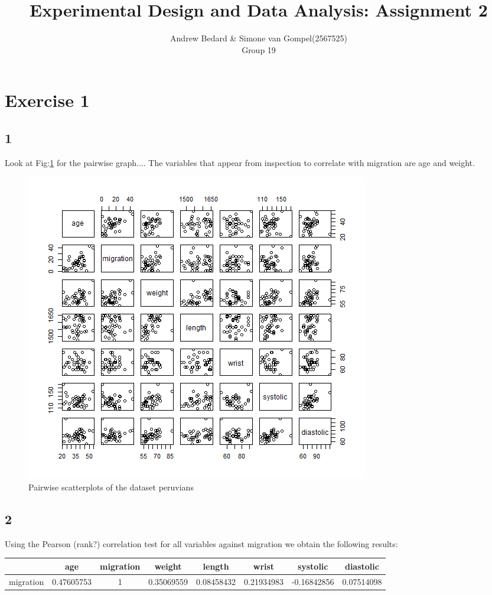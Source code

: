 \documentclass{article}
\title{Experimental Design and Data Analysis: Assignment 2}
\author{Andrew Bedard \& Simone van Gompel(2567525) \\ Group 19}
\begin{document}
  \maketitle

  \section{Exercise 1}
  \subsection*{1}
  	Look at Fig:\ref{fig:Pairs} for the pairwise graph....
  	The variables that appear from inspection to correlate with migration are age and weight.

    \begin{figure}
      \includegraphics[scale=0.6]{../results/Pairs.png}
      \caption{Pairwise scatterplots of the dataset peruvians}
      \label{fig:Pairs}
    \end{figure}
    
    \subsection*{2}
    Using the Pearson (rank?) correlation test for all variables against migration we obtain the following results:
    \newline
    \begin{tabular}{|c|c|c|c|c|c|c|c|}
    \hline 
     & age & migration & weight & length & wrist & systolic & diastolic \\ 
    \hline 
    migration & 0.47605753 & 1 & 0.35069559 & 0.08458432 & 0.21934983 & -0.16842856 & 0.07514098 \\ 
    \hline 
    \end{tabular} 
    
\end{document}
